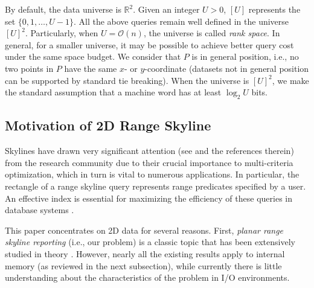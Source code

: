 \documentclass{sig-alternate}
\def\real{\mathbb{R}}
\newcommand{\bigO}{\mathcal{O}}
\renewcommand{\(}{\left(}
\renewcommand{\)}{\right)}
\begin{document}
By default, the data universe is $\real^2$. Given an integer $U > 0$, $[U]$
represents the set $\{0, 1, \ldots, U-1\}$. All the above queries remain well
defined in the universe $[U]^2$. Particularly, when $U = \bigO(n)$, the
universe is called {\em rank space}. In general, for a smaller universe, it may
be possible to achieve better query cost under the same space budget. We consider that $P$ is in general position, i.e., no two points in $P$ have
the same $x$- or $y$-coordinate (datasets not in general position can be
supported by standard tie breaking). When the universe is $[U]^2$, we make the
standard assumption that a machine word has at least $\log_2 U$ bits.

\subsection{Motivation of 2D Range Skyline} \label{sec:intro-motivation}

Skylines have drawn very significant attention (see \cite{BT11, AFGT97,
DGKASK12, FR90, J91, KDKS11, K00, OL81, BCP08, BKS01, CGGL05, KRR02, MPJ07,
PTFS05, SLNX09, SSK09, ST11} and the references therein) from the research
community due to their crucial importance to multi-criteria optimization, which
in turn is vital to numerous applications. In particular, the rectangle of a
range skyline query represents range predicates specified by a user. An
effective index is essential for maximizing the efficiency of these queries in
database systems \cite{KRR02, PTFS05}.

This paper concentrates on 2D data for several reasons. First, {\em planar range skyline reporting} (i.e., our problem) is a classic topic that has been extensively studied in theory  \cite{BT11, AFGT97, DGKASK12, FR90, J91, KDKS11, K00, OL81}. However, nearly all the existing results  apply to internal memory (as reviewed in the next subsection), while currently there is little understanding about the characteristics of the problem in I/O environments.
\end{document}
